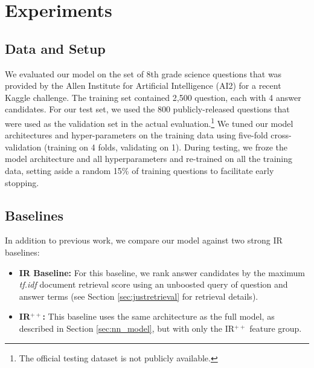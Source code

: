 \section{Experiments}
\label{sec:experiments}

\subsection{Data and Setup}
We evaluated our model on the set of 8th grade science questions that was provided by the Allen Institute for Artificial Intelligence (AI2) for a recent Kaggle challenge.  The training set contained 2,500 question, each with 4 answer candidates.  For our test set, we used the 800 publicly-released questions that were used as the validation set in the actual evaluation.\footnote{The official testing dataset is not publicly available.}  We tuned our model architectures and hyper-parameters on the training data using five-fold cross-validation (training on 4 folds, validating on 1).  During testing, we froze the model architecture and all hyperparameters and re-trained on all the training data, setting aside a random 15\% of training questions to facilitate early stopping. 

\subsection{Baselines}
In addition to previous work, we compare our model against two strong IR baselines:
%

\begin{itemize}
\item \textbf{IR Baseline:} For this baseline, we rank answer candidates by the maximum \emph{tf.idf} document retrieval score using an unboosted query of question and answer terms (see Section \ref{sec:justretrieval} for retrieval details).

\item \textbf{IR$^{++}$:}  This baseline uses the same architecture as the full model, as described in Section \ref{sec:nn_model}, but with only the IR$^{++}$ feature group.
\end{itemize}

